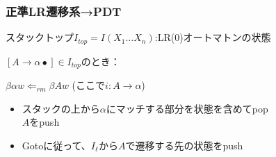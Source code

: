 \documentclass[dvipdfmx]{beamer}
\begin{document}
\begin{frame}
  \frametitle{正準LR遷移系→PDT}
  スタックトップ$I_{top}=I(X_1\ldots X_n)$:LR(0)オートマトンの状態
  \begin{trivlist}
    \item [{\bf 還元}]
    $[A\rightarrow\alpha\bullet]\in I_{top}$のとき：


    $\beta\alpha w\Leftarrow_{rm}\beta Aw$ (ここで$i:A\rightarrow\alpha$)


    {\small
        \begin{itemize}
          \item<2-> スタックの上から$\alpha$にマッチする部分を状態を含めてpop\\
                $A$をpush
          \item<3> Gotoに従って、$I_\ell$から$A$で遷移する先の状態をpush
        \end{itemize}
      }


\end{trivlist}
\end{frame}
\end{document}
